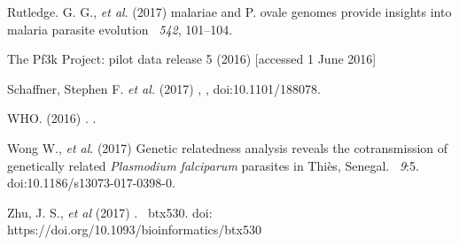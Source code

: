 \documentclass{article}
\begin{document}
\begin{thebibliography}{}
Rutledge. G. G., {\em et al}. (2017)
 malariae and P. ovale genomes provide insights into malaria parasite evolution
~{\em 542}, 101--104.


The Pf3k Project: pilot data release 5 (2016)
 [accessed 1 June 2016]


Schaffner, Stephen F. {\em et al.} (2017)
,
, doi:10.1101/188078.

WHO. (2016)
.
.

Wong W., {\em et al}. (2017)
\newblock Genetic relatedness analysis reveals the cotransmission of genetically related {\it Plasmodium falciparum} parasites in Thiès, Senegal.
~{\em 9}:5. doi:10.1186/s13073-017-0398-0.


Zhu, J. S., {\em et al} (2017)
.
~{\em \/}btx530. doi: https://doi.org/10.1093/bioinformatics/btx530

\end{thebibliography}
\end{document}
